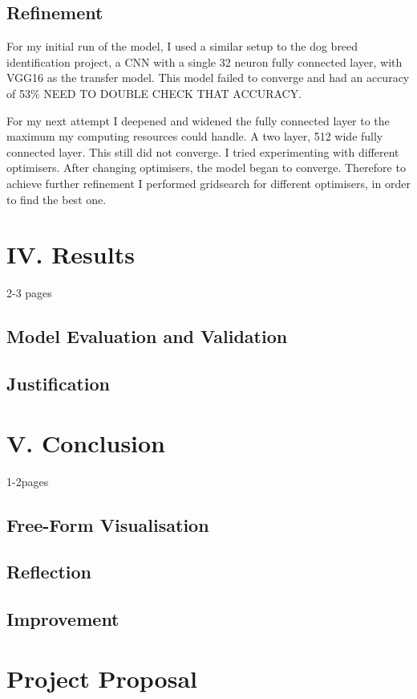 \documentclass{article}
\begin{document}
\subsection{Refinement}
For my initial run of the model, I used a similar setup to the dog breed identification project, a CNN with a single 32 neuron fully connected layer, with VGG16 as the transfer model. This model failed to converge and had an accuracy of 53\% NEED TO DOUBLE CHECK THAT ACCURACY.

For my next attempt I deepened and widened the fully connected layer to the maximum my computing resources could handle. A two layer, 512 wide fully connected layer. This still did not converge. I tried experimenting with different optimisers. After changing optimisers, the model began to converge. Therefore to achieve further refinement I performed gridsearch for different optimisers, in order to find the best one. 
\section{IV. Results}
2-3 pages
\subsection{Model Evaluation and Validation}
\subsection{Justification}

\section{V. Conclusion}
1-2pages
\subsection{Free-Form Visualisation}
\subsection{Reflection}
\subsection{Improvement}



\newpage{}
\section{Project Proposal}
\end{document}

